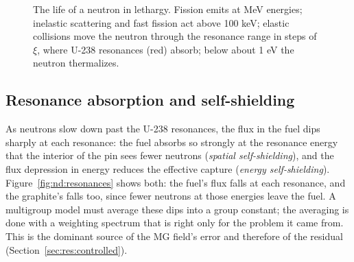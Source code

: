 \begin{figure}[t]\centering
{}
\caption{The life of a neutron in lethargy. Fission emits at MeV energies; inelastic scattering and fast
fission act above 100 keV; elastic collisions move the neutron through the resonance range in steps of
$\xi$, where U-238 resonances (red) absorb; below about 1 eV the neutron thermalizes.}\label{fig:nd:cascade}
\end{figure}

\subsection{Resonance absorption and self-shielding}

As neutrons slow down past the U-238 resonances, the flux in the fuel dips sharply at each resonance:
the fuel absorbs so strongly at the resonance energy that the interior of the pin sees fewer neutrons
(\emph{spatial self-shielding}), and the flux depression in energy reduces the effective capture
(\emph{energy self-shielding}). Figure~\ref{fig:nd:resonances} shows both: the fuel's flux falls at
each resonance, and the graphite's falls too, since fewer neutrons at those energies leave the
fuel. A multigroup model must average these dips into a group constant; the averaging is done with a
weighting spectrum that is right only for the problem it came from. This is the dominant source of
the MG field's error and therefore of the residual (Section~\ref{sec:res:controlled}).

